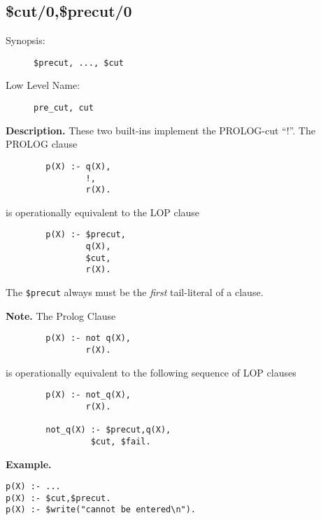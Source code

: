 %
%
%
\subsection{\$cut/0,\$precut/0}

\begin{description}
\item[Synopsis:]
	{\tt \$precut, ..., \$cut}
\item[Low Level Name:]
	{\tt pre\_cut, cut}
\end{description}

\vspace*{0.5cm}
\noindent
{\bf Description.}
These two built-ins implement the PROLOG-cut ``!''.
The PROLOG clause
\begin{verbatim}
        p(X) :- q(X),
                !,
                r(X).
\end{verbatim}
% 
is operationally equivalent to the LOP clause
% 
\begin{verbatim}
        p(X) :- $precut,
                q(X),
                $cut,
                r(X).
\end{verbatim}
The {\tt \$precut} always must be the {\em first\/} tail-literal of a clause.

\vspace*{0.5cm}
\noindent
{\bf Note.}
The Prolog Clause
 
\begin{verbatim}
        p(X) :- not q(X),
                r(X).
\end{verbatim}
 
             is operationally equivalent to the following sequence of
             LOP clauses
 
\begin{verbatim}
        p(X) :- not_q(X),
                r(X).
 
        not_q(X) :- $precut,q(X),
                 $cut, $fail.
\end{verbatim}
 


\vspace*{0.5cm}
\noindent
{\bf Example.}
\begin{verbatim}
p(X) :- ...
p(X) :- $cut,$precut.
p(X) :- $write("cannot be entered\n").
\end{verbatim}


